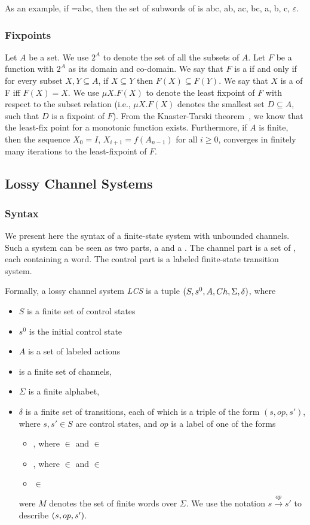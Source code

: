 As an example, if =abc, then the set of subwords of  is {abc, ab, ac, bc, a, b, c, $\varepsilon$}.

\subsubsection{Fixpoints}
Let $A$ be a set. We use $2^A$ to denote the set of all the subsets of $A$. Let $F$ be a function with $2^A$ as its domain and co-domain. We say that $F$ is a  if and only if for every subset $X,Y \subseteq A$, if $X \subseteq Y$ then $F(X) \subseteq F(Y)$.  We say that $X$ is a  of F iff $F(X)=X$. We use $\mu X. F(X)$ to denote the least fixpoint of $F$ with respect to the subset relation (i.e.,  $\mu X. F(X)$ denotes the smallest set $D \subseteq A$, such that $D$ is a fixpoint of $F$). From the Knaster-Tarski theorem~\cite{tarski}, we know that the least-fix point for a monotonic function exists. Furthermore, if $A$ is finite, then the sequence $X_0 = I$, $X_{i+1} = f(A_{n-1})$ for all $i \geq 0$, converges in finitely many iterations to the least-fixpoint of $F$.

\subsection{Lossy Channel Systems}
\label{CS}
\subsubsection{Syntax}
We present here the syntax of a finite-state system with unbounded channels. Such a system can be seen as two parts, a  and a . The channel part is a set of , each containing a word. The control part is a labeled finite-state transition system.

Formally, a lossy channel system \emph{LCS} is a tuple $(S,s^0, A, Ch,\Sigma, \delta)$, where
\begin{itemize}
  \item $S$ is a finite set of control states
  \item $s^0$ is the initial control state
  \item $A$ is a set of labeled actions
  \item {} is a finite set of channels,
  \item $\Sigma$ is a finite alphabet,
  \item $\delta$ is a finite set of transitions, each of which is a triple of the form $( s,op,s')$, where $s, s'\in S$ are control states, and $op$ is a label of one of the forms
    \begin{itemize}
      \item {}, where  $\in$  and  $\in$ 
      \item {}, where  $\in$  and  $\in$ 
      \item {} $\in$ 
    \end{itemize}
    were $M$ denotes the set of finite words over $\Sigma$. We use the notation $s \xrightarrow{op} s'$ to describe $(s, op, s')$.
\end{itemize}

